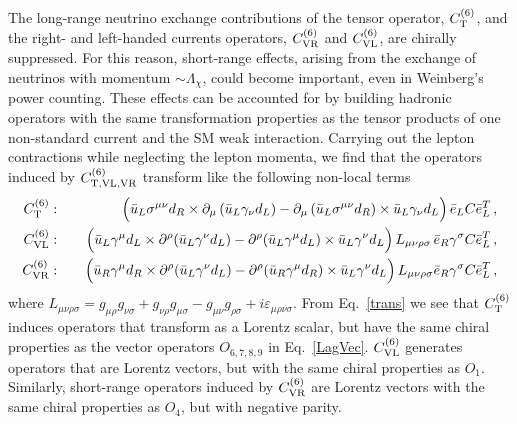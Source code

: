 \documentclass[letterpaper,11pt]{article}
\newcommand{\nn}{\nonumber}
\begin{document}
The long-range neutrino exchange  contributions of  the tensor operator, $C^{(6)}_{\rm T}$, and the  
right- and left-handed currents operators, $C^{(6)}_{\rm VR}$ and $C^{(6)}_{\rm VL}$, 
are chirally suppressed. For this reason,  short-range effects, arising from the exchange of neutrinos with momentum $\sim \Lambda_\chi$, could become important,
even in Weinberg's power counting. These effects can be accounted for by building hadronic operators with the same transformation properties as the tensor products 
of one non-standard current and the SM weak interaction. Carrying out the lepton contractions while neglecting the lepton momenta,  we find that the operators induced by $C^{(6)}_{\rm T, VL, VR}$ transform like the following non-local terms
\begin{eqnarray}
C^{(6)}_{\rm T} : & &  \quad  \Big(  \bar u_L \sigma^{\mu\nu} d_R \times   \partial_\mu \left( \bar u_L \gamma_\nu d_L \right) 
			             - \partial_\mu \left(    \bar u_L \sigma^{\mu\nu} d_R \right) \times   \bar u_L \gamma_\nu d_L  \Big)  \, \bar e_L C \bar e_L^T \,, \nn \\
C^{(6)}_{\rm VL} : & &  \quad  \Big( \bar u_L \gamma^\mu d_L \times  \partial^\rho ( \bar u_L \gamma^\nu d_L) -\partial^{\rho} (\bar u_L \gamma^\mu d_L)\times \bar u_L \gamma^\nu d_L   \Big)  \, L_{\mu\nu\rho\sigma}   \, \bar e_R \gamma^\sigma C \bar e_L^T \,, \nn \\
C^{(6)}_{\rm VR} : & &  \quad   \Big( \bar u_R \gamma^\mu d_R \times  \partial^\rho ( \bar u_L \gamma^\nu d_L) -\partial^{\rho} (\bar u_R \gamma^\mu d_R)\times \bar u_L \gamma^\nu d_L   \Big) \,  L_{\mu\nu\rho\sigma}   \bar e_R \gamma^\sigma C \bar e_L^T\,,
  \label{trans}
\end{eqnarray}
where $L_{\mu\nu\rho\sigma} = g_{\mu \rho} g_{\nu \sigma} + g_{\nu \rho} g_{\mu \sigma} - g_{\mu \nu} g_{\rho \sigma}  + i \varepsilon_{\mu\rho\nu\sigma} $.
From Eq.~\eqref{trans} we see that $C^{(6)}_{\rm T}$ induces operators that transform as a Lorentz scalar, but have the same chiral properties as the vector operators $O_{6,7,8,9}$ in Eq.~\eqref{LagVec}.
$C^{(6)}_{\rm VL}$  generates operators that are Lorentz vectors, but with the same chiral properties as $O_1$.  Similarly, short-range operators induced by  
$C^{(6)}_{\rm VR}$ are Lorentz vectors with the same chiral properties as $O_4$, but with negative parity.  
\end{document}
